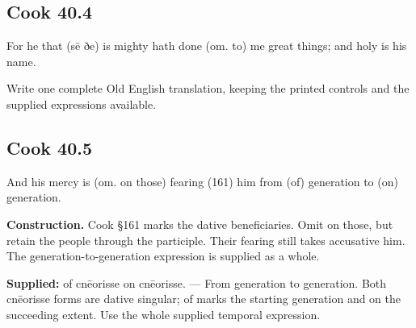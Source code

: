 \par\begin{minipage}{\linewidth}\raggedright
\subsection*{Cook 40.4}

For he that (sē ðe) is mighty hath done (om. to) me great things; and holy is his name.

Write one complete Old English translation, keeping the printed controls and the supplied expressions available.

\end{minipage}\par\addvspace{4pt}

\par\begin{minipage}{\linewidth}\raggedright
\subsection*{Cook 40.5}

And his mercy is (om. on those) fearing (161) him from (of) generation to (on) generation.

\end{minipage}\par\addvspace{4pt}

\textbf{Construction.} Cook §161 marks the dative beneficiaries. Omit on those, but retain the people through the participle. Their fearing still takes accusative him. The generation-to-generation expression is supplied as a whole.

\textbf{Supplied:} of cnēorisse on cnēorisse. — From generation to generation. Both cnēorisse forms are dative singular; of marks the starting generation and on the succeeding extent. Use the whole supplied temporal expression.

